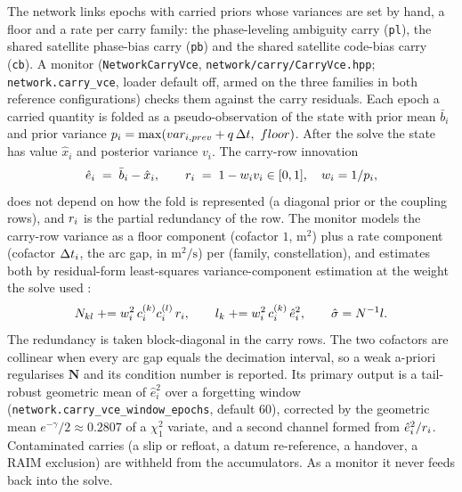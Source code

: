 \documentclass[main.tex]{subfiles}
\begin{document}
The network links epochs with carried priors whose variances are set by hand,
a floor and a rate per carry family: the phase-leveling ambiguity carry
(\texttt{pl}), the shared satellite phase-bias carry (\texttt{pb}) and the
shared satellite code-bias carry (\texttt{cb}).  A monitor
(\texttt{NetworkCarryVce}, \texttt{network/carry/CarryVce.hpp};
\texttt{network.carry\_vce}, loader default off, armed on the three families in
both reference configurations) checks them against the carry residuals.  Each
epoch a carried quantity is folded as a pseudo-observation of the state with
prior mean $\bar b_i$ and prior variance
$p_i = \max(var_{i,prev} + q\,\Delta t,\ floor)$.  After the
solve the state has value $\hat x_i$ and posterior variance $v_i$.  The
carry-row innovation
\begin{equation}
\hat e_i \;=\; \bar b_i - \hat x_i,
\qquad
r_i \;=\; 1 - w_i v_i \in [0,1],\quad w_i = 1/p_i,
\label{eq:qc-carry-innov}
\end{equation}
does not depend on how the fold is represented (a diagonal prior or the
coupling rows), and $r_i$ is the partial redundancy of the row.  The
monitor models the carry-row variance as a floor component (cofactor $1$,
$\mathrm{m}^2$) plus a rate component (cofactor $\Delta t_i$, the arc gap, in
$\mathrm{m}^2/\mathrm{s}$) per (family, constellation), and estimates both by
residual-form least-squares variance-component estimation at the weight the
solve used \cite{teunissen2008lsvce}:
\begin{equation}
N_{kl} \mathrel{+}= w_i^2\,c^{(k)}_i c^{(l)}_i\,r_i,
\qquad
l_k \mathrel{+}= w_i^2\,c^{(k)}_i\,\hat e_i^2,
\qquad
\hat{\sigma} = N^{-1}l .
\label{eq:qc-carry-lsvce}
\end{equation}
The redundancy is taken block-diagonal in the carry rows.  The two cofactors
are collinear when every arc gap equals the decimation interval, so a weak
a-priori regularises $\bm N$ and its condition number is reported.  Its primary
output is a tail-robust geometric mean of $\hat e_i^2$ over a forgetting window
(\texttt{network.carry\_vce\_window\_epochs}, default $60$), corrected by the
geometric mean $e^{-\gamma}/2\approx 0.2807$ of a $\chi^2_1$ variate, and a
second channel formed from $\hat e_i^2/r_i$.  Contaminated carries (a slip
or refloat, a datum re-reference, a handover, a RAIM exclusion) are withheld
from the accumulators.  As a monitor it never feeds back into the solve.
\end{document}
